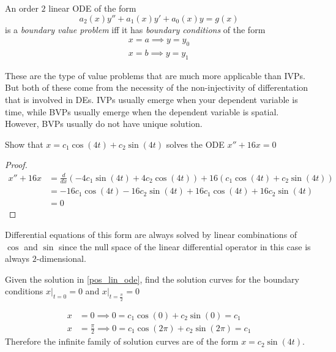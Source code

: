 \documentclass[notes.tex]{subfiles}
\begin{document}
\begin{definition}
    An order $2$ linear ODE of the form
    \[
        a_2(x)y'' + a_1(x)y' + a_0(x)y = g(x)
    \]
    is a \textit{boundary value problem} iff it has \textit{boundary conditions} of the form
    \begin{align*}
        x = a \implies y = y_0 \\
        x = b \implies y = y_1
    \end{align*}
\end{definition}
These are the type of value problems that are much more applicable than IVPs. But both of these come from the necessity of the non-injectivity of differentation that is involved in DEs. IVPs usually emerge when your dependent variable is time, while BVPs usually emerge when the dependent variable is spatial. However, BVPs usually do not have unique solution.

\begin{exercise} \label{pos_lin_ode}
    Show that $x = c_1\cos(4t) + c_2\sin(4t)$ solves the ODE $x'' + 16x = 0$
\end{exercise}
\begin{proof}
    \begin{align*}
        x'' + 16x
        &= \frac{d}{dx}(-4c_1\sin(4t) + 4c_2\cos(4t)) + 16(c_1\cos(4t) + c_2\sin(4t)) \\
        &= -16c_1\cos(4t) - 16c_2\sin(4t) + 16c_1\cos(4t) + 16c_2\sin(4t) \\
        &= 0
    \end{align*}
\end{proof}
Differential equations of this form are always solved by linear combinations of $\cos$ and $\sin$ since the null space of the linear differential operator in this case is always $2$-dimensional.

\begin{exercise}
    Given the solution in \cref{pos_lin_ode}, find the solution curves for the boundary conditions $x|_{t = 0} = 0$ and $x|_{t = \frac{\pi}{2}} = 0$
\end{exercise}
\begin{solution}
    \begin{align*}
        x &= 0 \implies 0 = c_1\cos(0) + c_2\sin(0) = c_1 \\
        x &= \frac{\pi}{2} \implies 0 = c_1\cos(2\pi) + c_2\sin(2\pi) = c_1
    \end{align*}
    Therefore the infinite family of solution curves are of the form $x = c_2\sin(4t)$.
\end{solution}
\end{document}
